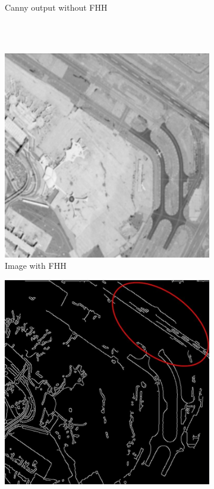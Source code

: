 \documentclass[conference]{IEEEtran}
\begin{document}
\begin{figure}
\begin{subfigure}[b]{0.48\linewidth}
        \caption{Canny output without FHH \label{subfig:no_fhh_b}}
    \end{subfigure} \\ \vspace{-1mm} \\
     \begin{subfigure}[b]{0.48\linewidth}
        \centerline{\includegraphics[width=\linewidth]{fuzzy_a.JPG}}
        \caption{Image with FHH \label{subfig:fhh_a}}
    \end{subfigure}
    \begin{subfigure}[b]{0.48\linewidth}
        \centerline{\includegraphics[width=\linewidth]{fuzzy_b.JPG}}

\end{subfigure}
\end{figure}
\end{document}
